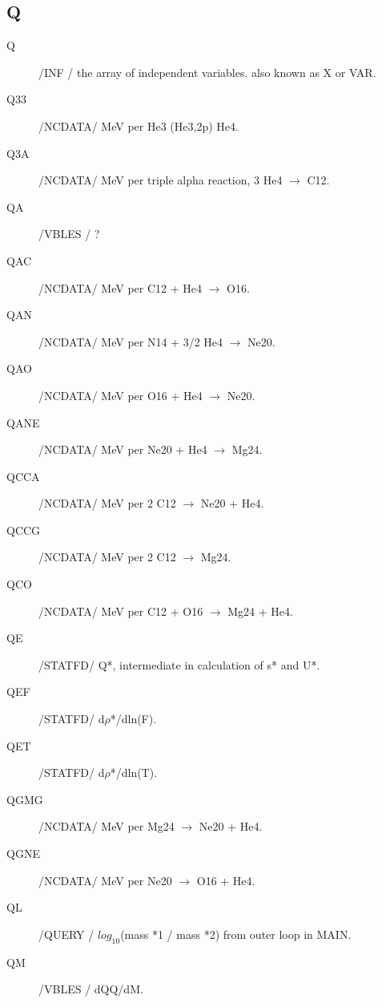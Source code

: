 \documentclass{article}
\begin{document}
\subsection*{Q}
\begin{description}
	\item[Q]		    /INF   / the array of independent variables. also known as X or VAR.
	
	\item[Q33]		    /NCDATA/ MeV per He3 (He3,2p) He4.

	\item[Q3A]		    /NCDATA/ MeV per triple alpha reaction, 3 He4 $\to$ C12.

	\item[QA]      	/VBLES /  ?
	
	\item[QAC	]	    /NCDATA/ MeV per C12 + He4 $\to$ O16.

	\item[QAN	]	    /NCDATA/ MeV per N14 + 3/2 He4 $\to$ Ne20.

	\item[QAO]		    /NCDATA/ MeV per O16 + He4 $\to$ Ne20.

	\item[QANE]		/NCDATA/ MeV per Ne20 + He4 $\to$ Mg24.

	\item[QCCA]		/NCDATA/ MeV per 2 C12 $\to$ Ne20 + He4.

	\item[QCCG]		/NCDATA/ MeV per 2 C12 $\to$ Mg24.

	\item[QCO]		    /NCDATA/ MeV per C12 + O16 $\to$ Mg24 + He4.

	\item[QE]      	/STATFD/ Q*, intermediate in calculation of s* and U*.

	\item[QEF]     	/STATFD/ d$\rho$*/dln(F).

	\item[QET]     	/STATFD/ d$\rho$*/dln(T).

	\item[QGMG]		/NCDATA/ MeV per Mg24 $\to$ Ne20 + He4.

	\item[QGNE]		/NCDATA/ MeV per Ne20 $\to$ O16 + He4.

	\item[QL]		    /QUERY / $log_{10}$(mass *1 / mass *2) from outer loop in MAIN.

	\item[QM]      	/VBLES / dQQ/dM.


\end{description}
\end{document}
